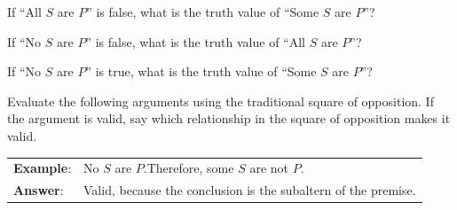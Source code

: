 \begin{exercises}
\item If ``All $S$ are $P$'' is false, what is the truth value of ``Some $S$ are $P$''? 

\item If ``No $S$ are $P$'' is false, what is the truth value of ``All $S$ are $P$''? 

\item If ``No $S$ are $P$'' is true, what is the truth value of ``Some $S$ are $P$''? 

\end{exercises}

\noindent\problempart Evaluate the following arguments using the traditional square of opposition. If the argument is valid, say which relationship in the square of opposition makes it valid. 

\begin{longtabu}{p{.1\linewidth}p{.9\linewidth}}
\textbf{Example}: & No $S$ are $P$.Therefore, some $S$ are not $P$.\\
\textbf{Answer}: & Valid, because the conclusion is the subaltern of the premise.\\
\end{longtabu}


